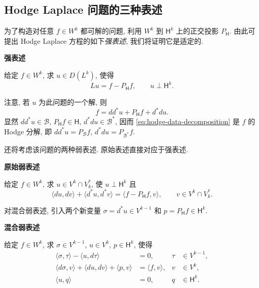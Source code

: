 \subsection{{Hodge Laplace 问题的三种表述}}\label{subsec:hodge-three-formulations}

{为了构造对任意 $f\in W^k$ 都可解的问题, 利用 $W^k$ 到 $\mathsf H^k$ 上的正交投影 $P_{\mathsf H}$. 由此可提出 Hodge Laplace 方程的如下\emph{强表述}, 我们将证明它是适定的.}

\medskip\noindent\textbf{{强表述}}\par
{给定 $f\in W^k$, 求 $u\in D(L^k)$, 使得}
\begin{equation}\label{eq:hodge-strong-formulation}
Lu=f-P_{\mathsf H}f,\qquad u\perp\mathsf H^k.
\end{equation}

{注意, 若 $u$ 为此问题的一个解, 则}
\begin{equation}\label{eq:hodge-data-decomposition}
f=dd^*u+P_{\mathsf H}f+d^*du.
\end{equation}
{显然 $dd^*u\in\mathcal B$, $P_{\mathsf H}f\in\mathsf H$, $d^*du\in\mathcal B^*$, 因而 \eqref{eq:hodge-data-decomposition} 是 $f$ 的 Hodge 分解, 即 $dd^*u=P_{\mathcal B}f$, $d^*du=P_{\mathcal B^*}f$.}

{还将考虑该问题的两种弱表述. 原始表述直接对应于强表述.}

\medskip\noindent\textbf{{原始弱表述}}\par
{给定 $f\in W^k$, 求 $u\in V^k\cap V_k^*$, 使 $u\perp\mathsf H^k$ 且}
\begin{equation}\label{eq:hodge-primal-formulation}
\langle du,dv\rangle+\langle d^*u,d^*v\rangle=\langle f-P_{\mathsf H}f,v\rangle,\qquad v\in V^k\cap V_k^*.
\end{equation}

{对混合弱表述, 引入两个新变量 $\sigma=d^*u\in V^{k-1}$ 和 $p=P_{\mathsf H}f\in\mathsf H^k$.}

\medskip\noindent\textbf{{混合弱表述}}\par
{给定 $f\in W^k$, 求 $\sigma\in V^{k-1}$, $u\in V^k$, $p\in\mathsf H^k$, 使得}
\begin{equation}\label{eq:hodge-mixed-formulation}
\begin{aligned}
\langle\sigma,\tau\rangle-\langle u,d\tau\rangle&=0,&\tau&\in V^{k-1},\\
\langle d\sigma,v\rangle+\langle du,dv\rangle+\langle p,v\rangle&=\langle f,v\rangle,&v&\in V^k,\\
\langle u,q\rangle&=0,&q&\in\mathsf H^k.
\end{aligned}
\end{equation}

